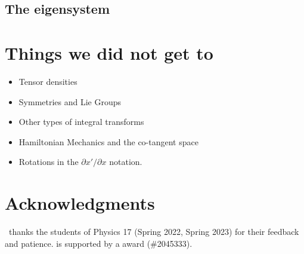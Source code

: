 \documentclass[12pt]{article}
\begin{document}
\subsection{The eigensystem}




\appendix

\section{Things we did not get to}
\begin{itemize}
\item Tensor densities
\item Symmetries and Lie Groups
\item Other types of integral transforms
\item Hamiltonian Mechanics and the co-tangent space
\item Rotations in the $\partial x'/\partial x$ notation.
\end{itemize}




\section*{Acknowledgments}

\ thanks the students of Physics 17 (Spring 2022, Spring 2023) for their feedback and patience.
%
 is supported by a  award (\#2045333).



% 
\end{document}
